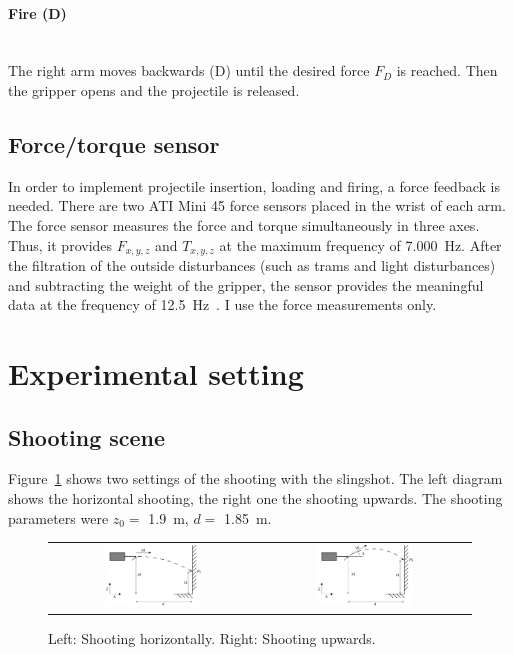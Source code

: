 			\paragraph{Fire (D)}~\\
				\indent The right arm moves backwards (D) until the desired force $ F_D$ is reached. Then the gripper opens and the projectile is released.

		\subsection{Force/torque sensor}
			In order to implement projectile insertion, loading and firing, a force feedback is needed. There are two ATI Mini 45 force sensors placed in the wrist of each arm. The force sensor measures the force and torque simultaneously in three axes. Thus, it provides $F_{x, y, z}$ and $T_{x,y,z}$ at the maximum frequency of \SI{7,000}{Hz}. After the filtration of the outside disturbances (such as trams and light disturbances) and subtracting the weight of the gripper, the sensor provides the meaningful data at the frequency of \SI{12.5}{Hz}~\cite{KubesForceSensor}. I use the force measurements only.
	
	
	\section{Experimental setting}

		\subsection{Shooting scene}
		
			Figure~\ref{fig:shooting setting} shows two settings of the shooting with the slingshot. The left diagram shows the horizontal shooting, the right one the shooting upwards. The shooting parameters were $z_0 = $ \SI{1.9}{m}, $ d = $ \SI{1.85}{m}.
			
			\begin{figure}[h]
			\centering
			\begin{tabular}{cc}
			\includegraphics[width=0.48\textwidth]{horizontal.png}
			&
			\includegraphics[width=0.48\textwidth]{askew.png}
			\end{tabular}
			\caption{Left: Shooting horizontally. Right: Shooting upwards.}
			\label{fig:shooting setting}
			\end{figure}
			
